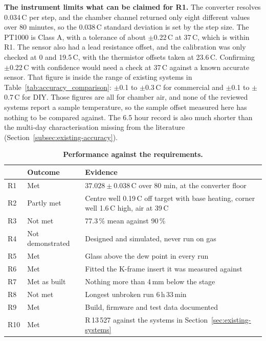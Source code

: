\textbf{The instrument limits what can be claimed for R1.} The converter resolves 0.034\,\textdegree{}C per step, and the chamber channel returned only eight different values over 80 minutes, so the 0.038\,\textdegree{}C standard deviation is set by the step size. The PT1000 is Class A, with a tolerance of about $\pm$0.22\,\textdegree{}C at 37\,\textdegree{}C, which is within R1. The sensor also had a lead resistance offset, and the calibration was only checked at 0 and 19.5\,\textdegree{}C, with the thermistor offsets taken at 23.6\,\textdegree{}C. Confirming $\pm$0.22\,\textdegree{}C with confidence would need a check at 37\,\textdegree{}C against a known accurate sensor. That figure is inside the range of existing systems in Table~\ref{tab:accuracy_comparison}: $\pm$0.1 to $\pm$0.3\,\textdegree{}C for commercial and $\pm$0.1 to $\pm$0.7\,\textdegree{}C for DIY. Those figures are all for chamber air, and none of the reviewed systems report a sample temperature, so the sample offset measured here has nothing to be compared against. The 6.5 hour record is also much shorter than the multi-day characterisation missing from the literature (Section~\ref{subsec:existing-accuracy}).

\begin{table}[H]
    \centering
    \caption[Performance against the requirements]{\textbf{Performance against the requirements.}}
    \label{tab:disc-requirements}
    \small
    \begin{tabular}{@{}llp{10.5cm}@{}}
        \toprule
        & \textbf{Outcome} & \textbf{Evidence} \\
        \midrule
        R1 & Met & $37.028 \pm 0.038$\,\textdegree{}C over 80 min, at the converter floor \\
        R2 & Partly met & Centre well 0.19\,\textdegree{}C off target with base heating, corner well 1.6\,\textdegree{}C high, air at 39\,\textdegree{}C \\
        R3 & Not met & 77.3\,\% mean against 90\,\% \\
        R4 & Not demonstrated & Designed and simulated, never run on gas \\
        R5 & Met & Glass above the dew point in every run \\
        R6 & Met & Fitted the K-frame insert it was measured against \\
        R7 & Met as built & Nothing more than 4\,mm below the stage \\
        R8 & Not met & Longest unbroken run 6\,h\,33\,min \\
        R9 & Met & Build, firmware and test data documented \\
        R10 & Met & R\,13\,527 against the systems in Section~\ref{sec:existing-systems} \\
        \bottomrule
    \end{tabular}
\end{table}

